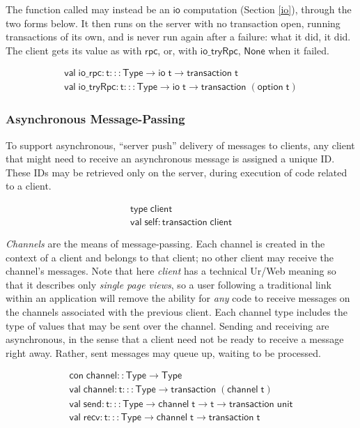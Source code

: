\documentclass{article}
\newcommand{\mt}[1]{\mathsf{#1}}
\begin{document}
The function called may instead be an $\mt{io}$ computation (Section \ref{io}), through the two forms below.  It then runs on the server with no transaction open, running transactions of its own, and is never run again after a failure: what it did, it did.  The client gets its value as with $\mt{rpc}$, or, with $\mt{io\_tryRpc}$, $\mt{None}$ when it failed.

$$\begin{array}{l}
  \mt{val} \; \mt{io\_rpc} : \mt{t} ::: \mt{Type} \to \mt{io} \; \mt{t} \to \mt{transaction} \; \mt{t} \\
  \mt{val} \; \mt{io\_tryRpc} : \mt{t} ::: \mt{Type} \to \mt{io} \; \mt{t} \to \mt{transaction} \; (\mt{option} \; \mt{t})
\end{array}$$

\subsubsection{Asynchronous Message-Passing}

To support asynchronous, ``server push'' delivery of messages to clients, any client that might need to receive an asynchronous message is assigned a unique ID.  These IDs may be retrieved only on the server, during execution of code related to a client.

$$\begin{array}{l}
  \mt{type} \; \mt{client} \\
  \mt{val} \; \mt{self} : \mt{transaction} \; \mt{client}
\end{array}$$

\emph{Channels} are the means of message-passing.  Each channel is created in the context of a client and belongs to that client; no other client may receive the channel's messages.  Note that here \emph{client} has a technical Ur/Web meaning so that it describes only \emph{single page views}, so a user following a traditional link within an application will remove the ability for \emph{any} code to receive messages on the channels associated with the previous client.  Each channel type includes the type of values that may be sent over the channel.  Sending and receiving are asynchronous, in the sense that a client need not be ready to receive a message right away.  Rather, sent messages may queue up, waiting to be processed.

$$\begin{array}{l}
  \mt{con} \; \mt{channel} :: \mt{Type} \to \mt{Type} \\
  \mt{val} \; \mt{channel} : \mt{t} ::: \mt{Type} \to \mt{transaction} \; (\mt{channel} \; \mt{t}) \\
  \mt{val} \; \mt{send} : \mt{t} ::: \mt{Type} \to \mt{channel} \; \mt{t} \to \mt{t} \to \mt{transaction} \; \mt{unit} \\
  \mt{val} \; \mt{recv} : \mt{t} ::: \mt{Type} \to \mt{channel} \; \mt{t} \to \mt{transaction} \; \mt{t}
\end{array}$$
\end{document}

